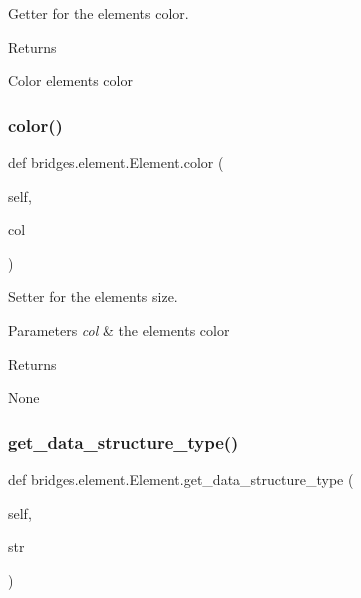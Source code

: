 Getter for the element\textquotesingle{}s color. 

\begin{DoxyReturn}{Returns}


Color element\textquotesingle{}s color 
\end{DoxyReturn}
\mbox{\label{classbridges_1_1element_1_1_element_ace59b1eb4cf0d775e9afa31605183c50}} 
\subsubsection{\texorpdfstring{color()}{color()}\hspace{0.1cm}{\footnotesize\ttfamily [2/2]}}
{\footnotesize\ttfamily def bridges.\+element.\+Element.\+color (\begin{DoxyParamCaption}\item[{}]{self,  }\item[{}]{col }\end{DoxyParamCaption})}



Setter for the element\textquotesingle{}s size. 


\begin{DoxyParams}{Parameters}
{\em col} & the element\textquotesingle{}s color \\
\hline
\end{DoxyParams}
\begin{DoxyReturn}{Returns}


None 
\end{DoxyReturn}
\mbox{\label{classbridges_1_1element_1_1_element_a87b8c79123d20eb2af48ae4e4f1bcf32}} 
\subsubsection{\texorpdfstring{get\+\_\+data\+\_\+structure\+\_\+type()}{get\_data\_structure\_type()}}
{\footnotesize\ttfamily def bridges.\+element.\+Element.\+get\+\_\+data\+\_\+structure\+\_\+type (\begin{DoxyParamCaption}\item[{}]{self,  }\item[{}]{str }\end{DoxyParamCaption})}



